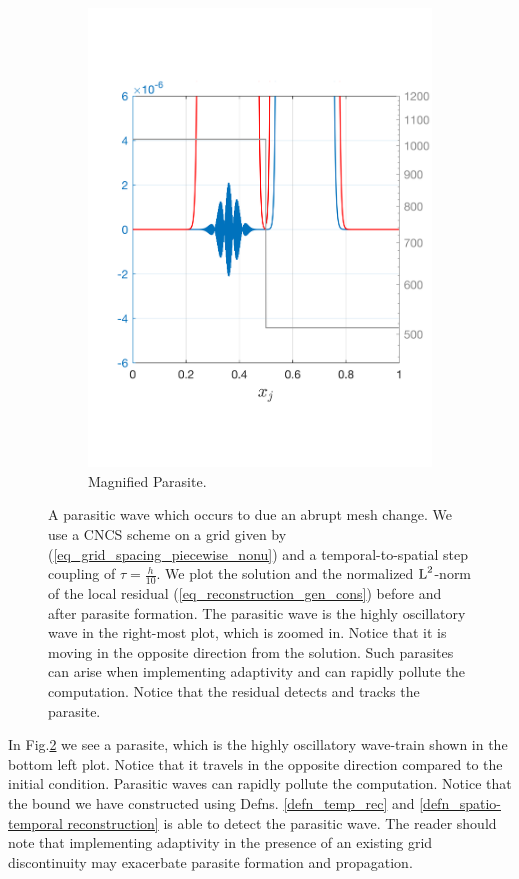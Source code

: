 \documentclass[final]{amsart}
\numberwithin{equation}{section}
\begin{document}
\begin{figure}[H]
\begin{subfigure}[b]{.3\textwidth}
	\includegraphics[width=\textwidth]{../figures/fig_CNCS_4000_para_1_zoom}	
	\caption{\label{fig:CNCS_parasite_1D_2_zoom}
		Magnified Parasite.
	}
\end{subfigure}
	\caption{A parasitic wave which occurs to due an abrupt mesh change.  We use a CNCS scheme on a grid given by (\ref{eq_grid_spacing_piecewise_nonu}) and a temporal-to-spatial step coupling of $\tau=\frac{h}{10}$.  We plot the solution and the normalized $\operatorname L^{2}$-norm of the local residual (\ref{eq_reconstruction_gen_cons}) before and after parasite formation.  The parasitic wave is the highly oscillatory wave in the right-most plot, which is zoomed in.  Notice that it is moving in the opposite direction from the solution. Such parasites can arise when implementing adaptivity and can rapidly pollute the computation. Notice that the residual detects and tracks the parasite.}
	\label{fig:CNCS_parasite}
\end{figure}
In Fig.\ref{fig:CNCS_parasite} we see a parasite, which is the highly oscillatory wave-train shown in the bottom left plot.  Notice that it travels in the opposite direction compared to the initial condition.    Parasitic waves can rapidly pollute the computation.     Notice that the bound we have constructed using Defns. \ref{defn_temp_rec} and \ref{defn_spatio-temporal reconstruction} is able to detect the parasitic wave.  The reader should note that implementing adaptivity in the presence of an existing grid discontinuity may exacerbate parasite formation and propagation.
\end{document}
